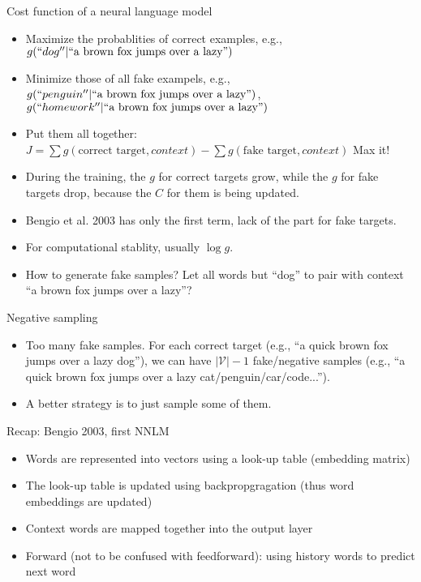 \documentclass[10pt]{beamer}
\begin{document}
\begin{frame}{Cost function of a neural language model}
 \begin{itemize}[<+->]
  \item Maximize the probablities of correct examples, e.g., $g(``dog''|\text{``a brown fox jumps over a lazy''})$ 
  \item Minimize those of all fake exampels,  e.g., $g(``penguin''|\text{``a brown fox jumps over a lazy''})$, $g(``homework''|\text{``a brown fox jumps over a lazy''})$
  \item Put them all together: 
   $J = \sum g(\text{correct target}, context) - \sum g(\text{fake target}, context)$ 
   Max it! 
  \item During the training, the $g$ for correct targets grow, while the $g$ for fake targets drop, because the $C$ for them is being updated. 
  \item Bengio et al. 2003 has only the first term, lack of the part for fake targets. 
  \item For computational stablity, usually $\log g$.
  \item How to generate fake samples? Let all words but ``dog'' to pair with context ``a brown fox jumps over a lazy''? 
 \end{itemize}
\end{frame}

\begin{frame}{Negative sampling}
 \begin{itemize}[<+->]
  \item Too many fake samples. For each correct target (e.g., ``a quick brown fox jumps over a lazy dog''), we can have $|\mathcal{V}|-1$ fake/negative samples (e.g., ``a quick brown fox jumps over a lazy cat/penguin/car/code...''). 
  \item A better strategy is to just sample some of them. 
 \end{itemize}
\end{frame}

\begin{frame}{Recap: Bengio 2003, first NNLM}
\begin{itemize}[<+->]
  \item Words are represented into vectors using a look-up table (embedding matrix)
  \item The look-up table is updated using backpropgragation (thus word embeddings are updated)
  \item Context words are mapped together into the output layer 
  \item Forward (not to be confused with feedforward): using history words to predict next word 
\end{itemize}
\end{frame}
\end{document}

